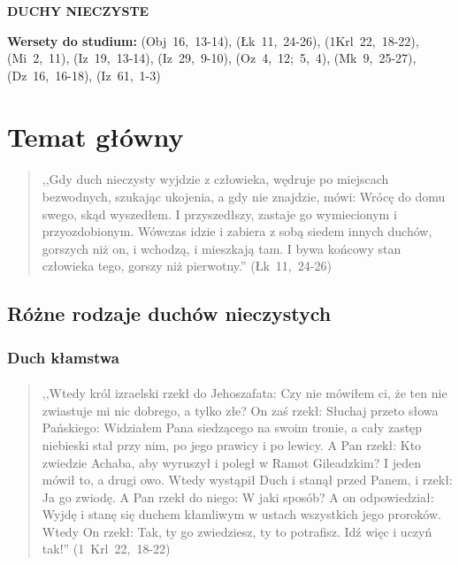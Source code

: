 \documentclass[10pt,a4paper,oneside]{article}
\begin{document}
\centerline{\textbf{\MakeUppercase{Duchy nieczyste}}}
\begin{center}
\textbf{Wersety do studium:} \mbox{(Obj 16, 13-14)}, \mbox{(Łk 11, 24-26)}, \mbox{(1Krl 22, 18-22)}, \mbox{(Mi 2, 11)}, \mbox{(Iz 19, 13-14)}, \mbox{(Iz 29, 9-10)}, \mbox{(Oz 4, 12; 5, 4)}, \mbox{(Mk 9, 25-27)}, \mbox{(Dz 16, 16-18)}, \mbox{(Iz 61, 1-3)}
\end{center}
\section{Temat główny}
\paragraph{}
\begin{quote}
,,Gdy duch nieczysty wyjdzie z człowieka, wędruje po miejscach bezwodnych, szukając ukojenia, a gdy nie znajdzie, mówi: Wrócę do domu swego, skąd wyszedłem. I przyszedłszy, zastaje go wymiecionym i przyozdobionym. Wówczas idzie i zabiera z sobą siedem innych duchów, gorszych niż on, i wchodzą, i mieszkają tam. I bywa końcowy stan człowieka tego, gorszy niż pierwotny.'' \mbox{(Łk 11, 24-26)}
\end{quote}
\subsection{Różne rodzaje duchów nieczystych}
\subsubsection{Duch kłamstwa}
\paragraph{}
\begin{quote}
,,Wtedy król izraelski rzekł do Jehoszafata: Czy nie mówiłem ci, że ten nie zwiastuje mi nic dobrego, a tylko złe? On zaś rzekł: Słuchaj przeto słowa Pańskiego: Widziałem Pana siedzącego na swoim tronie, a cały zastęp niebieski stał przy nim, po jego prawicy i po lewicy. A Pan rzekł: Kto zwiedzie Achaba, aby wyruszył i poległ w Ramot Gileadzkim? I jeden mówił to, a drugi owo. Wtedy wystąpił Duch i stanął przed Panem, i rzekł: Ja go zwiodę. A Pan rzekł do niego: W jaki sposób? A on odpowiedział: Wyjdę i stanę się duchem kłamliwym w ustach wszystkich jego proroków. Wtedy On rzekł: Tak, ty go zwiedziesz, ty to potrafisz. Idź więc i uczyń tak!'' \mbox{(1 Krl 22, 18-22)}
\end{quote}
\end{document}
